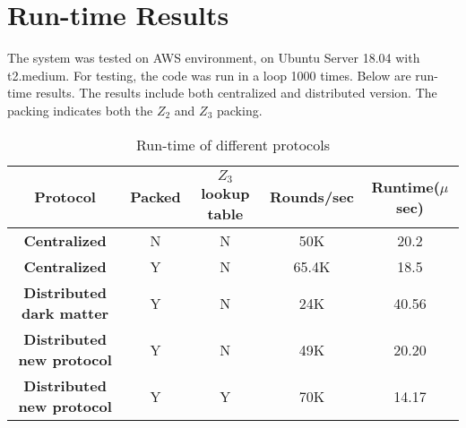\section{Run-time Results}

The system was tested on AWS environment, on Ubuntu Server 18.04 with t2.medium. For testing, the code was run in a loop 1000 times. Below are run-time results. The results include both centralized and distributed version. The packing indicates both the $Z_2$ and $Z_3$ packing.

\begin{table}[htbp]
	\begin{center}
		\begin{tabular}{|c|c|c|c|c|}
			\hline
			\textbf{Protocol} & \textbf{Packed }  &  \textbf{$Z_3$ lookup table} & \textbf{Rounds/sec} & Runtime($\mu$ sec)\\
			\hline
			\hline
			\textbf{Centralized}  & N  & N  &  50K&	20.2 \\
			\hline
			\textbf{Centralized} & Y  &  N & 65.4K &	18.5 \\
			\hline
			\textbf{Distributed dark matter} & Y	& N &  24K & 40.56	\\
			\hline
			\textbf{Distributed new protocol} & Y & N &	49K &  20.20\\
			\hline
			\textbf{Distributed new protocol} & Y & Y & 70K &  14.17	\\
			\hline
			
		\end{tabular}
		
		\vspace{-1mm}
		\caption{Run-time of different protocols}
		\label{RuntimeTable}
	\end{center}
	\vspace{-5mm}
\end{table}








